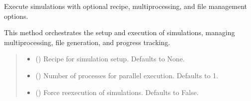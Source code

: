 \documentclass[letterpaper,10pt,english]{sphinxmanual}
\begin{document}
\begin{fulllineitems}

\begin{fulllineitems}
\label{\detokenize{API:raypyng.simulate.Simulate.run}}
\pysigstartsignatures
\pysiglinewithargsret
{}
{\sphinxparamcomma {}\sphinxparamcomma {}\sphinxparamcomma {}\sphinxparamcomma {}\sphinxparamcomma {}\sphinxparamcomma {}}
{}
\pysigstopsignatures
\sphinxAtStartPar
Execute simulations with optional recipe, multiprocessing, and file management options.

\sphinxAtStartPar
This method orchestrates the setup and execution of simulations, managing multiprocessing,
file generation, and progress tracking.
\begin{quote}\begin{description}
\begin{itemize}
\item {} 
\sphinxAtStartPar
{} (\sphinxstyleliteralemphasis{\sphinxupquote{, }}) \textendash{} Recipe for simulation setup.
Defaults to None.

\item {} 
\sphinxAtStartPar
{} (\sphinxstyleliteralemphasis{\sphinxupquote{, }}) \textendash{} Number of processes for parallel execution.
Defaults to 1.

\item {} 
\sphinxAtStartPar
{} (\sphinxstyleliteralemphasis{\sphinxupquote{, }}) \textendash{} Force re\sphinxhyphen{}execution of simulations.
Defaults to False.


\end{itemize}
\end{description}
\end{quote}
\end{fulllineitems}
\end{fulllineitems}
\end{document}
